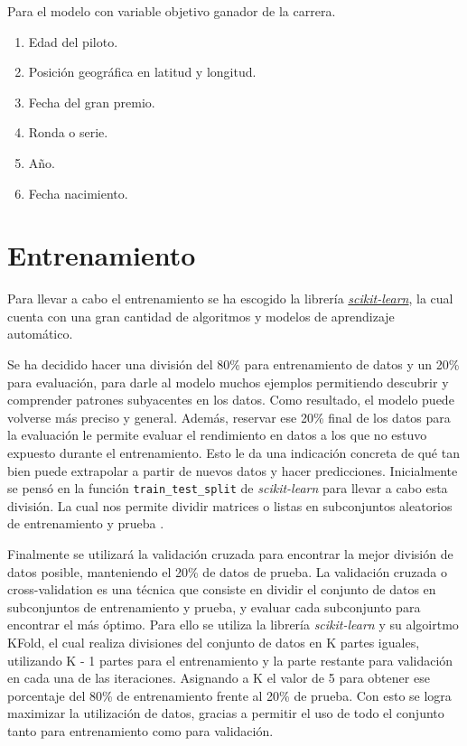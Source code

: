 Para el modelo con variable objetivo ganador de la carrera.
 \begin{enumerate}
    \item Edad del piloto.
    \item Posición geográfica en latitud y longitud.
    \item Fecha del gran premio.
    \item Ronda o serie.
    \item Año.
    \item Fecha nacimiento.
\end{enumerate}


\section{Entrenamiento}
Para llevar a cabo el entrenamiento se ha escogido la librería \href{https://scikit-learn.org/stable/}{\textit{scikit-learn}}, la cual cuenta con una gran cantidad de algoritmos y modelos de aprendizaje automático.

Se ha decidido hacer una división del 80\% para entrenamiento de datos y un 20\% para evaluación, para darle al modelo muchos ejemplos permitiendo descubrir y comprender patrones subyacentes en los datos. Como resultado, el modelo puede volverse más preciso y general. Además, reservar ese 20\% final de los datos para la evaluación le permite evaluar el rendimiento en datos a los que no estuvo expuesto durante el entrenamiento. Esto le da una indicación concreta de qué tan bien puede extrapolar a partir de nuevos datos y hacer predicciones. 
Inicialmente se pensó en la función \texttt{train\_test\_split} de \textit{scikit-learn} para llevar a cabo esta división. La cual nos permite dividir matrices o listas en subconjuntos aleatorios de entrenamiento y prueba \cite{sklearn:traintestsplit}.

Finalmente se utilizará la validación cruzada para encontrar la mejor división de datos posible, manteniendo el 20\% de datos de prueba. La validación cruzada o cross-validation es una técnica que consiste en dividir el conjunto de datos en subconjuntos de entrenamiento y prueba, y evaluar cada subconjunto para encontrar el más óptimo. Para ello se utiliza la librería \textit{scikit-learn} y su algoirtmo KFold, el cual realiza divisiones del conjunto de datos en K partes iguales, utilizando K - 1 partes para el entrenamiento y la parte restante para validación en cada  una de las iteraciones. Asignando a K el valor de 5 para obtener ese porcentaje del 80\% de entrenamiento frente al 20\% de prueba. Con esto se logra maximizar la utilización de datos, gracias a permitir el uso de todo el conjunto tanto para entrenamiento como para validación.

